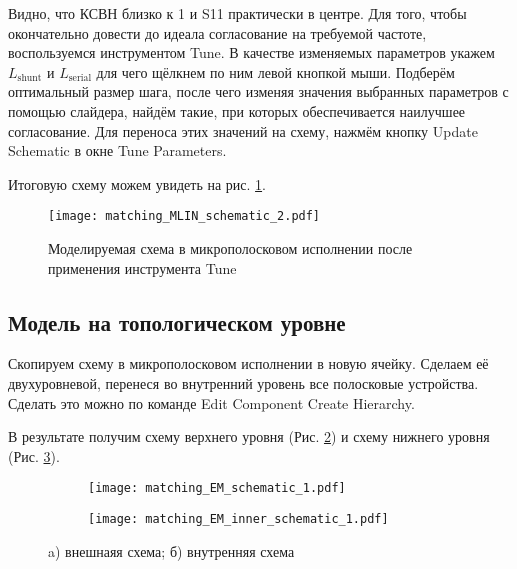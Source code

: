 Видно, что КСВН близко к 1 и S11 практически в центре.
Для того, чтобы окончательно довести до идеала согласование на требуемой частоте, воспользуемся инструментом Tune.
В качестве изменяемых параметров укажем $L_\text{shunt}$ и $L_\text{serial}$ для чего щёлкнем по ним левой кнопкой мыши.
Подберём оптимальный размер шага, после чего изменяя значения выбранных параметров с помощью слайдера, найдём такие, при которых обеспечивается наилучшее согласование.
Для переноса этих значений на схему, нажмём кнопку Update Schematic в окне Tune Parameters.

Итоговую схему можем увидеть на рис. \ref{fig:matching_MLIN_schematic_2}.

\begin{figure}
    \centering
    \texttt{[image: matching\_MLIN\_schematic\_2.pdf]}
    \caption{Моделируемая схема в микрополосковом исполнении после применения инструмента Tune}
    \label{fig:matching_MLIN_schematic_2}
\end{figure}

\subsection{Модель на топологическом уровне}

Скопируем схему в микрополосковом исполнении в новую ячейку. Сделаем её двухуровневой, перенеся во внутренний уровень все полосковые устройства. Сделать это можно по команде Edit \textrightarrow Component \textrightarrow Create Hierarchy.

В результате получим схему верхнего уровня (Рис. \ref{fig:matching_EM_schematic}) и схему нижнего уровня (Рис. \ref{fig:matching_EM_inner_schematic}).

\begin{figure}[!ht]
    \begin{subfigure}[b]{0.6\textwidth}
        \centering
        \texttt{[image: matching\_EM\_schematic\_1.pdf]}
        \caption{}
        \label{fig:matching_EM_schematic}
    \end{subfigure}
    \hfill
    \begin{subfigure}[b]{0.3\textwidth}
        \centering
        \texttt{[image: matching\_EM\_inner\_schematic\_1.pdf]}
        \caption{}
        \label{fig:matching_EM_inner_schematic}
    \end{subfigure}
    \caption{
        a) внешнаяя схема;
        б) внутренняя схема
    }
    \label{fig:matching_EM_schematics}
\end{figure}

